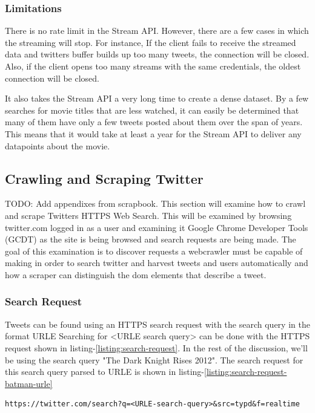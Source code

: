 \subsubsection{Limitations}
There is no rate limit in the Stream API. However, there are a few cases in which the streaming will stop. For instance, If the client fails to receive the streamed data and twitters buffer builds up too many tweets, the connection will be closed. Also, if the client opens too many streams with the same credentials, the oldest connection will be closed.

It also takes the Stream API a very long time to create a dense dataset. By a few searches for movie titles that are less watched, it can easily be determined that many of them have only a few tweets posted about them over the span of years. This means that it would take at least a year for the Stream API to deliver any datapoints about the movie.

\subsection{Crawling and Scraping Twitter}\label{sec:pre-twitter-crawl-scrape}
TODO: Add appendixes from scrapbook.
This section will examine how to crawl and scrape Twitters HTTPS Web Search. This will be examined by browsing twitter.com logged in as a user and examining it Google Chrome Developer Tools (GCDT)\cite{gcdt} as the site is being browsed and search requests are being made. The goal of this examination is to discover requests a webcrawler must be capable of making in order to search twitter and harvest tweets and users automatically and how a scraper can distinguish the dom elements that describe a tweet.


\subsubsection{Search Request}
Tweets can be found using an HTTPS search request with the search query in the format URLE \cite{w3-urle-ref}
Searching for <URLE search query> can be done with the HTTPS request shown in listing-\ref{listing:search-request}.
In the rest of the discussion, we'll be using the search query "The Dark Knight Rises 2012". The search request for this search query parsed to URLE is shown in listing-\ref{listing:search-request-batman-urle}

  \begin{lstlisting}[caption={URL of a twitter HTTPS search request for <URLE-search-query>},label={listing:search-request},captionpos=b]
  https://twitter.com/search?q=<URLE-search-query>&src=typd&f=realtime
  \end{lstlisting}

